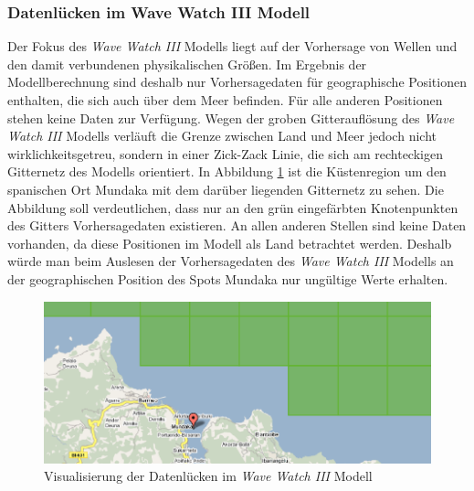 \subsubsection{Datenlücken im Wave Watch III Modell}
Der Fokus des \textit{Wave Watch III} Modells liegt auf der Vorhersage
von Wellen und den damit verbundenen physikalischen Größen. Im
Ergebnis der Modellberechnung sind deshalb nur Vorhersagedaten für
geographische Positionen enthalten, die sich auch über dem Meer
befinden. Für alle anderen Positionen stehen keine Daten zur
Verfügung. Wegen der groben Gitterauflösung des \textit{Wave Watch
  III} Modells verläuft die Grenze zwischen Land und Meer jedoch nicht
wirklichkeitsgetreu, sondern in einer Zick-Zack Linie, die sich am
rechteckigen Gitternetz des Modells orientiert. In Abbildung
\ref{positions-bestimmung} ist die Küstenregion um den spanischen Ort
Mundaka mit dem darüber liegenden Gitternetz zu sehen. Die Abbildung
soll verdeutlichen, dass nur an den grün eingefärbten Knotenpunkten
des Gitters Vorhersagedaten existieren. An allen anderen Stellen sind
keine Daten vorhanden, da diese Positionen im Modell als Land
betrachtet werden. Deshalb würde man beim Auslesen der Vorhersagedaten
des \textit{Wave Watch III} Modells an der geographischen Position des
Spots Mundaka nur ungültige Werte erhalten.

\begin{figure}
 \includegraphics[width=\textwidth]{bilder/locate-position}
 \caption{Visualisierung der Datenlücken im \textit{Wave Watch III}
   Modell}
 \label{positions-bestimmung}
\end{figure}

